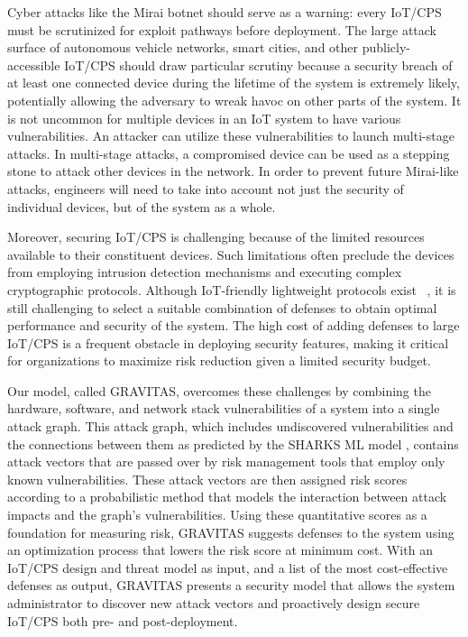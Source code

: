 \documentclass[10pt,journal,compsoc]{IEEEtran}
\begin{document}
\par Cyber attacks like the Mirai botnet should serve as a warning: every IoT/CPS must be scrutinized 
for exploit pathways before deployment. The large attack surface of autonomous vehicle networks, smart 
cities, and other publicly-accessible IoT/CPS should draw particular scrutiny because a security 
breach of at least one connected device during the lifetime of the system is extremely likely, potentially allowing the adversary to wreak havoc on 
other parts of the system. It is not uncommon for multiple devices in an IoT system to have
various vulnerabilities. An attacker can utilize these vulnerabilities to launch multi-stage
attacks. In multi-stage attacks, a compromised device can be used as a stepping stone to attack other 
devices in the network. In order to prevent future Mirai-like attacks, engineers will need to take 
into account not just the security of individual devices, but of the system as a whole. 
\par
Moreover, securing IoT/CPS is challenging because of the limited resources available to their constituent devices. Such limitations often preclude the devices from employing intrusion detection mechanisms and executing complex cryptographic protocols. Although IoT-friendly lightweight protocols exist ~\cite{sehwag2016tv,mckay2016report}, it is still challenging to select a suitable combination of defenses to obtain optimal performance and security of the system. The high cost of adding defenses to large IoT/CPS is a frequent obstacle in deploying security features, making it critical for organizations to maximize risk reduction given a limited security budget.

\par Our model, called GRAVITAS, overcomes these challenges by combining the hardware,
software, and network stack vulnerabilities of a system into a single attack graph. This attack
graph, which includes undiscovered vulnerabilities and the connections
between them as predicted by the SHARKS ML model \cite{saha2020}, contains attack vectors that
are passed over by risk management tools that employ only known vulnerabilities. These attack vectors are then assigned risk scores according to a probabilistic method that models the interaction between attack impacts and the graph's vulnerabilities. Using these quantitative scores as a foundation for measuring risk, GRAVITAS suggests defenses to the system using an optimization process that lowers the risk score at minimum cost. With an IoT/CPS design and threat model as input, and a list of the most cost-effective defenses as output, GRAVITAS presents a security model that allows the system administrator to discover new attack vectors and proactively design secure IoT/CPS both pre- and post-deployment.
\end{document}
